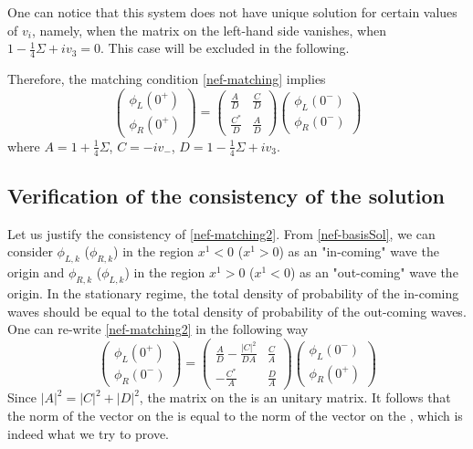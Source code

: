 One can notice that this system does not have unique solution for certain values of $v_i$, namely, when the matrix on the left-hand side vanishes, \ie when $1 - \frac{1}{4}\Sigma + iv_3 = 0$. This case will be excluded in the following.

Therefore, the matching condition \cref{nef-matching} implies 
\begin{equation}\label{nef-matching2}
\begin{pmatrix}
\phi_L(0^+) \\
\phi_R(0^+)
\end{pmatrix} = \begin{pmatrix}
\frac{A}{D}  & \frac{C}{D} \\
\frac{C^*}{D} & \frac{A}{D}
\end{pmatrix}\begin{pmatrix}
\phi_L(0^-) \\
\phi_R(0^-)
\end{pmatrix}
\end{equation}
where $A = 1+ \frac{1}{4}\Sigma$, $C = -iv_-$, $D = 1-\frac{1}{4}\Sigma + iv_3$.

\subsection{Verification of the consistency of the solution}
Let us justify the consistency of \cref{nef-matching2}. From \cref{nef-basisSol}, we can consider $\phi_{L,k}$ ($\phi_{R,k}$) in the region $x^1 < 0$ ($x^1 > 0 $) as an "in-coming" wave \wrt the origin and $\phi_{R,k}$ ($\phi_{L,k}$) in the region $x^1 > 0$ ($x^1 < 0 $) as an "out-coming" wave \wrt the origin. In the stationary regime, the total density of probability of the in-coming waves should be equal to the total density of probability of the out-coming waves. 
One can re-write \cref{nef-matching2} in the following way
\begin{equation}\label{nef-consistency}
\begin{pmatrix}
\phi_L(0^+) \\
\phi_R(0^-)
\end{pmatrix}=\begin{pmatrix}
\frac{A}{D} - \frac{| C |^2}{DA} & \frac{C}{A}  \\
-\frac{C^*}{A}  &  \frac{D}{A}
\end{pmatrix}\begin{pmatrix}
\phi_L(0^-) \\
\phi_R(0^+)
\end{pmatrix}
\end{equation} 
Since $|A|^2 = |C|^2 + |D|^2$, the matrix on the \rhs is an unitary matrix. It follows that the norm of the vector on the \lhs is equal to the norm of the vector on the \rhs, which is indeed what we try to prove.

